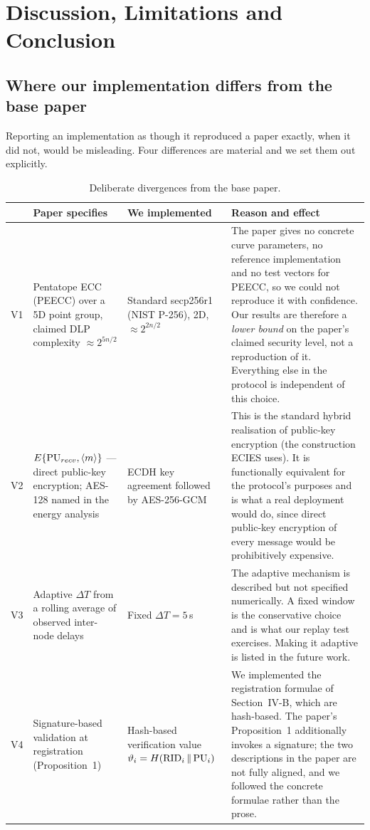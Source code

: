 \chapter{Discussion, Limitations and Conclusion}
\label{ch:conc}

\section{Where our implementation differs from the base paper}
\label{sec:deviations}

Reporting an implementation as though it reproduced a paper exactly, when it did not, would
be misleading. Four differences are material and we set them out explicitly.

\begin{table}[H]
\centering
\caption{Deliberate divergences from the base paper.}
\label{tab:deviations}
\small
\begin{tabularx}{\textwidth}{@{}L{6mm} L{34mm} L{40mm} X@{}}
\toprule
& \textbf{Paper specifies} & \textbf{We implemented} & \textbf{Reason and effect}\\
\midrule
V1 & Pentatope ECC (PEECC) over a 5D point group, claimed DLP complexity $\approx 2^{5n/2}$
   & Standard secp256r1 (NIST P-256), 2D, $\approx 2^{2n/2}$
   & The paper gives no concrete curve parameters, no reference implementation and no test
     vectors for PEECC, so we could not reproduce it with confidence. Our results are
     therefore a \emph{lower bound} on the paper's claimed security level, not a
     reproduction of it. Everything else in the protocol is independent of this choice.\\
\addlinespace[3pt]
V2 & $E\{\mathrm{PU}_{recv},\langle m \rangle\}$ --- direct public-key encryption; AES-128 named in
     the energy analysis
   & ECDH key agreement followed by AES-256-GCM
   & This is the standard hybrid realisation of public-key encryption (the construction
     ECIES uses). It is functionally equivalent for the protocol's purposes and is what a
     real deployment would do, since direct public-key encryption of every message would be
     prohibitively expensive.\\
\addlinespace[3pt]
V3 & Adaptive $\Delta T$ from a rolling average of observed inter-node delays
   & Fixed $\Delta T = 5$\,s
   & The adaptive mechanism is described but not specified numerically. A fixed window is
     the conservative choice and is what our replay test exercises. Making it adaptive is
     listed in the future work.\\
\addlinespace[3pt]
V4 & Signature-based validation at registration (Proposition~1)
   & Hash-based verification value $\vartheta_i = H(\mathrm{RID}_i \,\|\, \mathrm{PU}_i)$
   & We implemented the registration formulae of Section~IV-B, which are hash-based. The
     paper's Proposition~1 additionally invokes a signature; the two descriptions in the
     paper are not fully aligned, and we followed the concrete formulae rather than the
     prose.\\
\bottomrule
\end{tabularx}
\end{table}


